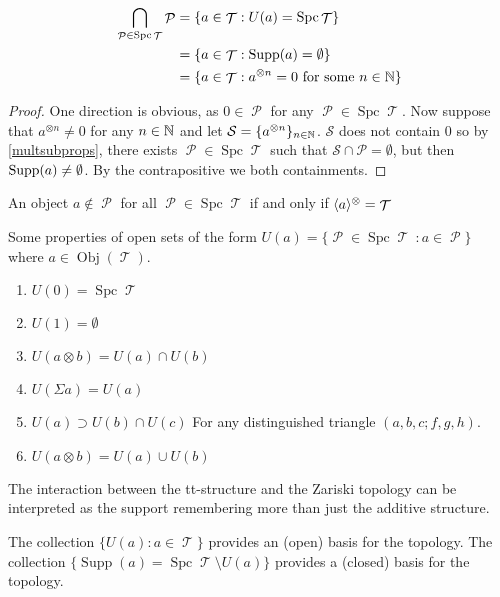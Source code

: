 \documentclass[11pt]{article}
\DeclareMathOperator{\ob}{Obj}
\DeclareMathOperator{\TT}{\mathcal{T}}
\DeclareMathOperator{\cP}{\mathcal{P}}
\DeclareMathOperator{\supp}{Supp}
\DeclareMathOperator{\spc}{Spc}
\begin{document}
\begin{cor}
	\begin{align*}
		\bigcap_{\cP \in \spc \TT} \cP &= \{a \in \TT: U(a) = \spc \TT\}\\
				&= \{a \in \TT: \Supp(a) = \emptyset\}\\
				&= \{a \in \TT: a^{\otimes n} = 0 \text{ for some } n \in \N\}
	\end{align*}
\end{cor}
\begin{proof}
One direction is obvious, as $0 \in \cP$ for any $\cP \in \spc \TT$. Now suppose that $a^{\otimes n} \not = 0$ for any $n \in \mathbb N$ and let $\mathcal{S} = \{a^{\otimes n}\}_{n \in \mathbb N}$. $\mathcal{S}$ does not contain $0$ so by \autoref{multsubprops}, there exists $\cP \in \spc \TT$ such that $\mathcal{S} \cap \mathcal{P} = \emptyset$, but then $\operatorname{Supp}(a) \not = \emptyset$. By the contrapositive we both containments.
\end{proof}

\begin{cor} An object $a \not\in \cP$ for all $\cP \in \spc \TT$ if and only if $\la a \ra^{\otimes} = \TT$

\end{cor}

\begin{prop} Some properties of open sets of the form $U(a) = \{\cP \in \spc\TT \ : a \in \cP\}$ where $a \in \ob(\TT)$.
\begin{enumerate}
    \item $U(0) = \spc\TT$
    \item $U(1) = \emptyset$
    \item $U(a\otimes b) = U(a) \cap U(b)$
    \item $U(\Sigma a) = U(a)$
    \item $U(a) \supset U(b) \cap U(c)$ For any distinguished triangle $(a,b,c; f,g,h)$.
    \item $U(a\otimes b) = U(a) \cup U(b)$
\end{enumerate}
\end{prop}

\begin{rmk} The interaction between the tt-structure and the Zariski topology can be interpreted as the support remembering more than just the additive structure.
\end{rmk}

\begin{cor} The collection $\{U(a):a \in \TT\}$ provides an (open) basis for the topology. The collection $\{\supp(a) = \spc\TT\setminus U(a)\}$ provides a (closed) basis for the topology.
\end{cor}
\end{document}
